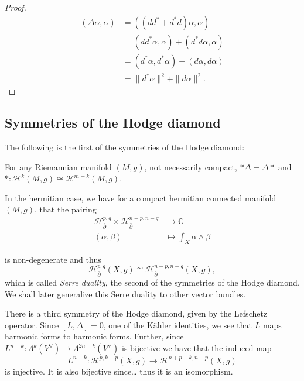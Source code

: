 \begin{proof}
$$
\begin{aligned}
(\Delta \alpha,\alpha)&=((d
d^*+d^*d)\alpha,\alpha)\\
&=(d d^*\alpha,\alpha)+(d^*d\alpha,\alpha)\\
&=(d^*\alpha,d^*\alpha)+(d\alpha,d\alpha)\\
&=\|d^*\alpha\|^2+\|d\alpha\|^2.
\end{aligned}
$$
\end{proof}

\subsection{Symmetries of the Hodge diamond}
\label{subsection-hodge-diamond-symmetries}

\noindent
The following is the first of the symmetries
of the Hodge diamond:

\begin{lemma}
\label{lemma-hodge-commutes-with-laplacian}
\begin{reference}
\cite[Lemma A.0.14]{huc}
\end{reference}
For any Riemannian manifold $(M,g)$,
not necessarily compact, $*\Delta=\Delta*$
and $*:\mathcal{H}^k(M,g) \cong
\mathcal{H}^{m-k}(M,g)$.
\end{lemma}

\noindent
In the hermitian case, we have for a compact
hermitian connected
manifold $(M,g)$, that the pairing
$$
\begin{aligned}
\mathcal{H}^{p,q}_{\bar\partial}
\times\mathcal{H}^{n-p,n-q}_{\bar\partial}
 &\longrightarrow \mathbb{C} \\
(\alpha,\beta) &\longmapsto
\int_X\alpha\wedge\beta
\end{aligned}
$$

\noindent
is non-degenerate and thus
$$
\mathcal{H}^{p,q}_{\bar\partial}(X,g)
\cong
\mathcal{H}^{n-p,n-q}_{\bar\partial}(X,g),
$$
which is called {\it Serre duality},
the second of the symmetries of the Hodge
diamond.
We shall later generalize this Serre duality
to other vector bundles.

There is a third symmetry of the Hodge
diamond,
given by the Lefschetz operator.
Since $[L,\Delta]=0$, one of the Kähler
identities,
we see that $L$ maps harmonic forms to
harmonic forms.
Further, since $L^{n-k}:\Lambda^k(V^\vee) \to
\Lambda^{2n-k}(V^\vee)$
is bijective we have that the induced map
$$
L^{n-k}:\mathcal{H}^{p,k-p}(X,g)
\to \mathcal{H}^{n+p-k,n-p}(X,g)
$$
is injective. It is also bijective since…
thus it is an isomorphism.

